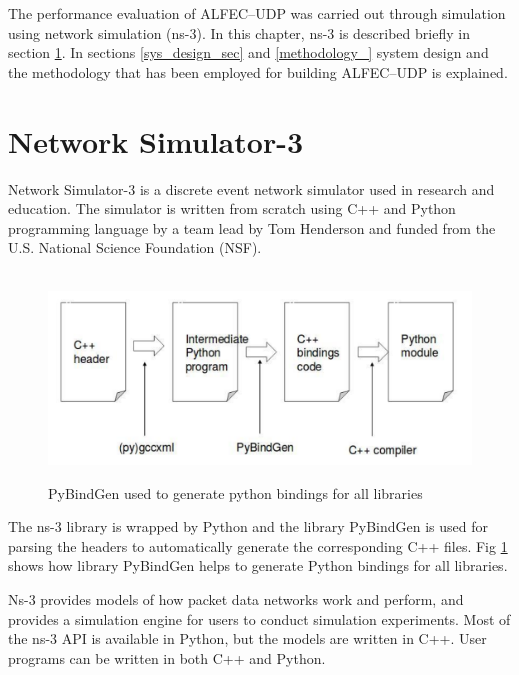 

\hspace{\parindent} The performance evaluation of ALFEC--UDP was carried out through simulation using network simulation (ns-3). In this chapter, ns-3 is described briefly in section \ref{ns3}. In sections \ref{sys_design_sec} and \ref{methodology_} system design and the methodology that has been employed for building ALFEC--UDP is explained.

\section{Network Simulator-3}
\label{ns3}
Network Simulator-3 is a discrete event network simulator used in research and education. The simulator is written from scratch using C++ and Python programming language by a team lead by Tom Henderson and funded from the U.S. National Science Foundation (NSF).

\begin{figure}[htbp]
\begin{center}
\mbox{
\includegraphics[width=4.5in]{Figures/python}}
\caption{PyBindGen used to generate python bindings for all libraries}
\label{python}
\end{center}
\end{figure}

The ns-3 library is wrapped by Python and the library PyBindGen is used for parsing the headers to automatically generate the corresponding C++ files. Fig \ref{python} shows how library PyBindGen helps to generate Python bindings for all libraries.

Ns-3 provides models of how packet data networks work and perform, and provides a simulation engine for users to conduct simulation experiments. Most of the ns-3 API is available in Python, but the models are written in C++. User programs can be written in both C++ and Python.

